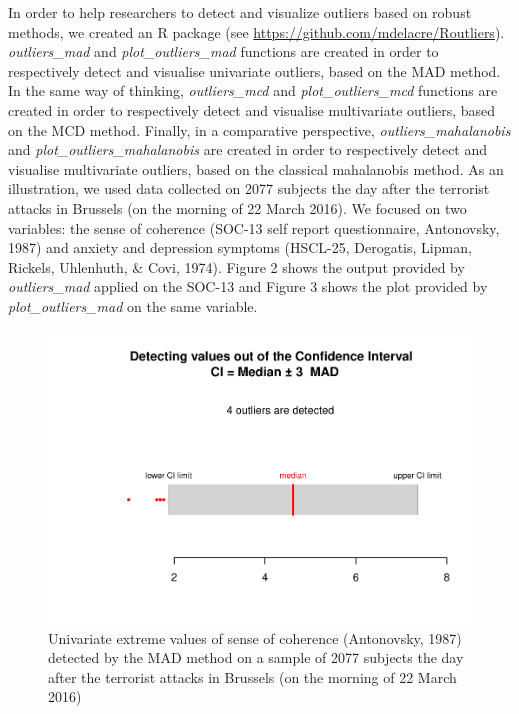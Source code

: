 \documentclass[man,floatsintext]{apa6}
\begin{document}
In order to help researchers to detect and visualize outliers based on robust methods, we created an R package (see \url{https://github.com/mdelacre/Routliers}). \emph{outliers\_mad} and \emph{plot\_outliers\_mad} functions are created in order to respectively detect and visualise univariate outliers, based on the MAD method. In the same way of thinking, \emph{outliers\_mcd} and \emph{plot\_outliers\_mcd} functions are created in order to respectively detect and visualise multivariate outliers, based on the MCD method. Finally, in a comparative perspective, \emph{outliers\_mahalanobis} and \emph{plot\_outliers\_mahalanobis} are created in order to respectively detect and visualise multivariate outliers, based on the classical mahalanobis method. As an illustration, we used data collected on 2077 subjects the day after the terrorist attacks in Brussels (on the morning of 22 March 2016). We focused on two variables: the sense of coherence (SOC-13 self report questionnaire, Antonovsky, 1987) and anxiety and depression symptoms (HSCL-25, Derogatis, Lipman, Rickels, Uhlenhuth, \& Covi, 1974). Figure 2 shows the output provided by \emph{outliers\_mad} applied on the SOC-13 and Figure 3 shows the plot provided by \emph{plot\_outliers\_mad} on the same variable.

\begin{figure}
\centering
\includegraphics{Outliers_files/figure-latex/MADSOC-1.pdf}
\caption{\label{fig:MADSOC}Univariate extreme values of sense of coherence (Antonovsky, 1987) detected by the MAD method on a sample of 2077 subjects the day after the terrorist attacks in Brussels (on the morning of 22 March 2016)}
\end{figure}
\end{document}
